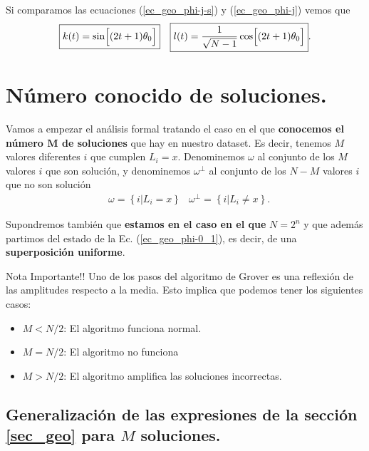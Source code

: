 \documentclass[a4paper,11pt]{article} %
\numberwithin{equation}{section}
\def\lch{\left\{}
\def\rch{\right\}}
\def\Lc{\Bigl[}
\def\Rc{\Bigr]}
\begin{document}
Si comparamos las ecuaciones (\ref{ec_geo_phi-j-s}) y (\ref{ec_geo_phi-j}) vemos que
\begin{align} \label{ec_geo_sin-cos}
& \boxed{k(t) = \sin \Lc (2t+1) \theta_0 \Rc}
& \boxed{l(t) = \frac{1}{\sqrt{N-1}}\cos \Lc (2t+1) \theta_0 \Rc}.
\end{align}



\newpage
\section{Número conocido de soluciones.} \label{sec_t-sols}

Vamos a empezar el análisis formal tratando el caso en el que \textbf{conocemos el número $\bm M$ de soluciones} que hay en nuestro dataset. Es decir, tenemos $M$ valores diferentes $i$ que cumplen $L_i=x$. Denominemos $\omega$ al conjunto de los $M$ valores $i$ que son solución, y denominemos $\omega^\perp$ al conjunto de los $N-M$ valores $i$ que no son solución
\begin{align}
& \boxed{\omega = \lch i | L_{i} = x \rch }
& \boxed{\omega^{\perp} = \lch i | L_{i} \neq x \rch}.
\end{align}

Supondremos también que \textbf{estamos en el caso en el que} $N = 2^n$ y que además partimos del estado de la Ec. (\ref{ec_geo_phi-0_1}), es decir, de una \textbf{superposición uniforme}. 

	\begin{mybox}{Nota Importante!!}
	Uno de los pasos del algoritmo de Grover es una reflexión de las amplitudes respecto a la media. 
	Esto implica que podemos tener los siguientes casos:
	\begin{itemize}
		\item $M < N/2$: El algoritmo funciona normal.
		
		\item $M = N/2$: El algoritmo no funciona
		
		\item $M > N/2$: El algoritmo amplifica las soluciones incorrectas.
	\end{itemize}
	\end{mybox}

\subsection{Generalización de las expresiones de la sección \ref{sec_geo} para $M$ soluciones.}
\end{document}
